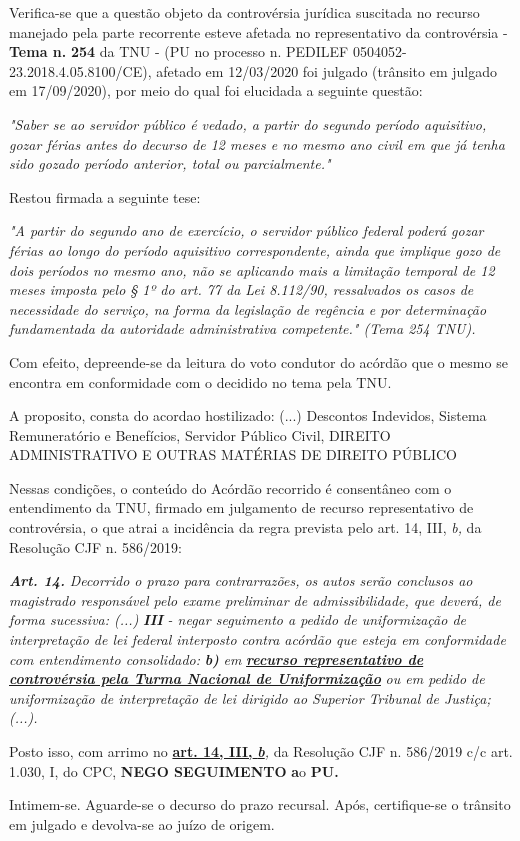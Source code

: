 \documentclass[12pt]{article}
\begin{document}
\justifying
\noindent Verifica-se que a questão objeto da controvérsia jurídica suscitada no recurso manejado pela parte recorrente esteve afetada no representativo da controvérsia - \textbf{Tema n. }\textbf{254} da TNU - (PU no processo n. PEDILEF 0504052-23.2018.4.05.8100/CE),  afetado em 12/03/2020 foi julgado (trânsito em julgado em 17/09/2020), por meio do qual foi elucidada a seguinte questão:

\noindent \textit{"Saber se ao servidor público é vedado, a partir do segundo período aquisitivo, gozar férias antes do decurso de 12 meses e no mesmo ano civil em que já tenha sido gozado período anterior, total ou parcialmente."}

\noindent Restou firmada a seguinte tese:

\noindent \textit{"A partir do segundo ano de exercício, o servidor público federal poderá gozar férias ao longo do período aquisitivo correspondente, ainda que implique gozo de dois períodos no mesmo ano, não se aplicando mais a limitação temporal de 12 meses imposta pelo § 1º do art. 77 da Lei 8.112/90, ressalvados os casos de necessidade do serviço, na forma da legislação de regência e por determinação fundamentada da autoridade administrativa competente." (Tema 254 TNU).}

\noindent Com efeito, depreende-se da leitura do voto condutor do acórdão que o mesmo se encontra em conformidade com o decidido no  tema pela TNU.

\noindent A proposito, consta do acordao hostilizado: (...) Descontos Indevidos, Sistema Remuneratório e Benefícios, Servidor Público Civil, DIREITO ADMINISTRATIVO E OUTRAS MATÉRIAS DE DIREITO PÚBLICO

\noindent Nessas condições, o conteúdo do Acórdão recorrido é consentâneo com o entendimento da TNU, firmado em julgamento de recurso representativo de controvérsia, o que atrai a incidência da regra prevista pelo art. 14, III, \textit{b,} da Resolução CJF n. 586/2019:

\noindent \textit{\textbf{Art. 14.}}\textit{ Decorrido o prazo para contrarrazões, os autos serão conclusos ao magistrado responsável pelo exame preliminar de admissibilidade, que deverá, de forma sucessiva: (...) }\textit{\textbf{III }}\textit{- negar seguimento a pedido de uniformização de interpretação de lei federal interposto contra acórdão que esteja em conformidade com entendimento consolidado: }\textit{\textbf{b)}}\textit{ em }\uline{\textit{\textbf{recurso representativo de controvérsia pela Turma Nacional de Uniformização}}}\textit{ ou em pedido de uniformização de interpretação de lei dirigido ao Superior Tribunal de Justiça;(...).}

\noindent Posto isso, com arrimo no \uline{\textbf{art. 14, III, }}\uline{\textit{\textbf{b}}}\textit{,} da Resolução CJF n. 586/2019 c/c art. 1.030, I, do CPC, \textbf{NEGO SEGUIMENTO }\textbf{a}o\textbf{ PU}\textbf{.}

\noindent Intimem-se. Aguarde-se o decurso do prazo recursal. Após, certifique-se o trânsito em julgado e devolva-se ao juízo de origem.
\end{document}
